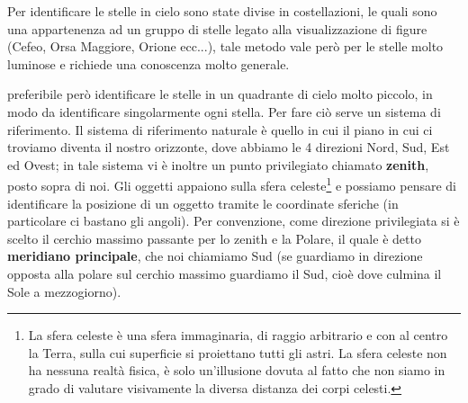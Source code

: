 Per identificare le stelle in cielo sono state divise in costellazioni, le quali sono una appartenenza ad un gruppo di stelle legato alla visualizzazione di figure (Cefeo, Orsa Maggiore, Orione ecc...), tale metodo vale però per le stelle molto luminose e richiede una conoscenza molto generale.

\E preferibile però identificare le stelle in un quadrante di cielo molto piccolo, in modo da identificare singolarmente ogni stella. Per fare ciò serve un sistema di riferimento. Il sistema di riferimento naturale è quello in cui il piano in cui ci troviamo diventa il nostro orizzonte, dove abbiamo le 4 direzioni Nord, Sud, Est ed Ovest; in tale sistema vi è inoltre un punto privilegiato chiamato \textbf{zenith}, posto sopra di noi. Gli oggetti appaiono sulla sfera celeste\footnote{La sfera celeste è una sfera immaginaria, di raggio arbitrario e con al centro la Terra, sulla cui superficie si proiettano tutti gli astri. La sfera celeste non ha nessuna realtà fisica, è solo un'illusione dovuta al fatto che non siamo in grado di valutare visivamente la diversa distanza dei corpi celesti.} e possiamo pensare di identificare la posizione di un oggetto tramite le coordinate sferiche (in particolare ci bastano gli angoli). Per convenzione, come direzione privilegiata si è scelto il cerchio massimo passante per lo zenith e la Polare, il quale è detto \textbf{meridiano principale}, che noi chiamiamo Sud (se guardiamo in direzione opposta alla polare sul cerchio massimo guardiamo il Sud, cioè dove culmina il Sole a mezzogiorno).


